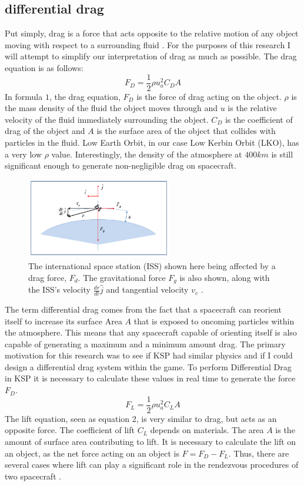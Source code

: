 \documentclass[journal,a4paper,12pt]{IEEEtran}
\begin{document}
\subsection{differential drag}
Put simply, drag is a force that acts opposite to the relative motion of any object
moving with respect to a surrounding fluid \cite{drag_deff}. For the purposes of this
research I will attempt to simplify our interpretation of drag as much as possible.
The drag equation is as follows:
\begin{equation}
F_D = \frac{1}{2} \rho u_a^2 C_D A
\end{equation}
In formula $1$, the drag equation, $F_D$ is the force of drag acting on the object.
$\rho$ is the mass density of the fluid the object moves through and $u$ is the relative
velocity of the fluid immediately surrounding the object. $C_D$ is the coefficient of
drag of the object and $A$ is the surface area of the object that collides with
particles in the fluid. Low Earth Orbit, in our case Low Kerbin Orbit (LKO),
has a very low $\rho$ value. Interestingly,
the density of the atmosphere at $400km$ is still significant enough to
generate non-negligible drag on spacecraft.

\begin{figure}[h!]
  \centering
  \includegraphics[width=2.5in]{img/ISSpng}
  \caption{The international space station (ISS) shown here being affected by a
  drag force, $F_d$. The gravitational force $F_g$ is also shown, along with the
  ISS's velocity $\frac{dr}{dt}\hat{j}$ and tangential velocity $v_c$ \cite{iss_boi}. }
  \label{drag_detector}
\end{figure}

The term differential drag
comes from the fact that a spacecraft can reorient itself to increase its surface
Area $A$ that is exposed to oncoming particles within the atmosphere. This means that any
spacecraft capable of orienting itself is also capable of generating a maximum
and a minimum amount drag.
The primary motivation for this research was to see if KSP had similar physics and
if I could design a differential drag system within the game. To perform Differential
Drag in KSP it is necessary to calculate
these values in real time to generate the force $F_D$.
\begin{equation}
F_L = \frac{1}{2} \rho u_a^2 C_L A
\end{equation}
The lift equation, seen as equation 2, is very similar to drag, but acts as an opposite force. The
coefficient of lift $C_L$ depends on materials. The area $A$ is the amount of surface area contributing
to lift. It is necessary to calculate the lift on an object, as the net
force acting on an object is $F = F_D - F_L$. Thus, there are several cases where lift
can play a significant role in the rendezvous procedures of two spacecraft \cite{lifty_boi}.
\end{document}

